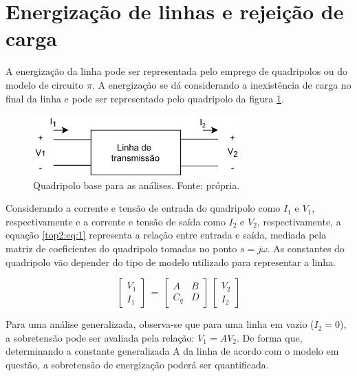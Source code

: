 \section{Energização de linhas e rejeição de carga}

A energização da linha pode ser representada pelo emprego de quadripolos ou do modelo de circuito $\pi$. A energização se dá considerando a inexistência de carga no final da linha e pode ser representado pelo quadripolo da figura \ref{top2:fig:1}.

\begin{figure}[H]
\begin{center}
\includegraphics[width=8cm]{images/quadripolo.jpg}
\caption{Quadripolo base para as análises. Fonte: própria.}
\label{top2:fig:1} 
\end{center}
\end{figure}

Considerando a corrente e tensão de entrada do quadripolo como $I_1$ e $V_1$, respectivamente e a corrente e tensão de saída como $I_2$ e $V_2$, respectivamente, a equação \ref{top2:eq:1} representa a relação entre entrada e saída, mediada pela matriz de coeficientes do quadripolo tomadas no ponto $s = j\omega$. As constantes do quadripolo vão depender do tipo de modelo utilizado para representar a linha. 

\begin{equation} \label{top2:eq:1}
    \begin{bmatrix} V_1 \\ I_1  \end{bmatrix} \,=\, \begin{bmatrix} A & B \\ C_q & D  \end{bmatrix}\, \begin{bmatrix} V_2 \\ I_2  \end{bmatrix}
\end{equation}

Para uma análise generalizada, observa-se que para uma linha em vazio ($I_2=0$), a sobretensão pode ser avaliada pela relação: $V_1 = AV_2$. De forma que, determinando a constante generalizada A da linha de acordo com o modelo em questão, a sobretensão de energização poderá ser quantificada.

